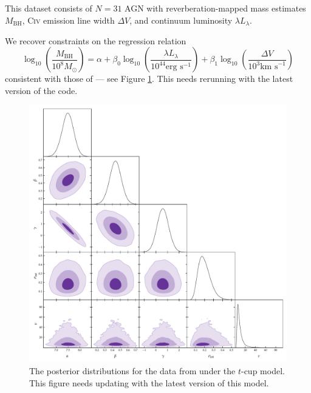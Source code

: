 \documentclass[fleqn,usenatbib]{mnras}
\begin{document}
\subsection{\citet{Park:2017}}

This dataset consists of $N = 31$ AGN with reverberation-mapped mass estimates
$M_{\text{BH}}$, \textsc{Civ} emission line width $\Delta V$, and continuum
luminosity $\lambda L_{\lambda}$.

We recover constraints on the regression relation
\begin{equation}
    \log_{10} \left( \frac{M_{\text{BH}}}{10^8 M_\odot} \right) =
        \alpha +
        \beta_0 \log_{10} \left( \frac{\lambda L_{\lambda}}{10^{44} \text{erg s}^{-1}} \right) +
        \beta_1 \log_{10} \left( \frac{\Delta V}{10^3 \text{km s}^{-1}} \right)
\end{equation}
consistent with those of \citet{Park:2017} --- see Figure
\ref{fig:real-world.park.corner}. {\color{red} This needs rerunning with the
latest version of the code.}

\begin{figure}
    \includegraphics[width=\columnwidth]{graphics/corner_park.pdf}
    \caption{The posterior distributions for the data from \citet{Park:2007}
    under the $t$-cup model. {\color{red} This figure
    needs updating with the latest version of this model.}}
    \label{fig:real-world.park.corner}
\end{figure}
\end{document}
